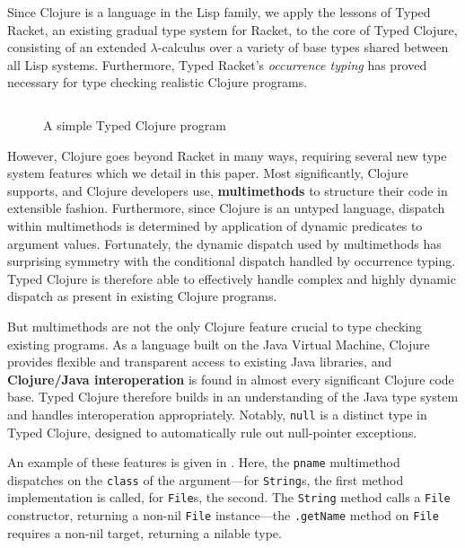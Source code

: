 Since Clojure is a language in the
Lisp family, we apply the lessons of Typed Racket, an existing gradual type
system for Racket, to the core of Typed Clojure, consisting of an extended
$\lambda$-calculus over a variety of base types shared between all Lisp systems.
%
Furthermore, Typed Racket's \emph{occurrence typing} has proved
necessary for type checking realistic Clojure programs.

\begin{figure}[t!]
\inputminted[firstline=15]{clojure}{code/demo/src/demo/ex-intro.clj}
\caption{A simple Typed Clojure program}
\label{fig:ex1}
\end{figure}


However, Clojure goes beyond Racket in many ways, requiring several
new type system features which we detail in this paper.
%
Most significantly, Clojure supports, and Clojure developers use,
\textbf{multimethods} to structure their code in extensible
fashion. Furthermore, since Clojure is an untyped language, dispatch
within multimethods is determined by application of dynamic predicates
to argument values. 
%
Fortunately, the dynamic dispatch used by multimethods has surprising
symmetry with the conditional dispatch handled by occurrence
typing. Typed Clojure is therefore able to effectively handle complex
and highly dynamic dispatch as present in existing Clojure programs. 

But multimethods are not the only Clojure feature crucial to type
checking existing programs. As a language built on the Java Virtual
Machine, Clojure provides flexible and transparent access to existing
Java libraries, and \textbf{Clojure/Java interoperation} is found in almost
every significant Clojure code base. Typed Clojure therefore builds in
an understanding of the Java type system and handles interoperation
appropriately. Notably, \texttt{null} is a distinct type in Typed Clojure,
designed to automatically rule out null-pointer exceptions.

An example of these features is given in
. Here, the \texttt{pname} multimethod dispatches
on the \texttt{class} of the argument---for \texttt{String}s,
the first method implementation is called, for \texttt{File}s, the
second. The \texttt{String} method calls
a \texttt{File} constructor, returning a non-nil \texttt{File} instance---the 
\texttt{.getName} method 
on \texttt{File} requires a non-nil target, returning a nilable
type.  

